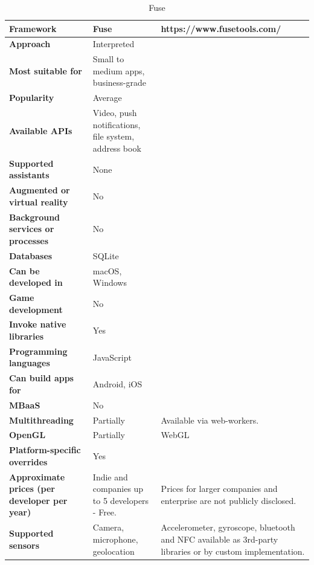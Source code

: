 \documentclass[english,master,public,dept460,male,cpdeclaration,oneside]{diploma}
\begin{document}
\begin{table}[!h]
	\centering
	\caption{Fuse}
	\begin{tabular}{p{} | p{} | p{}}
		\toprule		
		\textbf{Framework} & \textbf{Fuse} & https://www.fusetools.com/ \\
		\midrule
		\textbf{Approach} & Interpreted & \\			
		\midrule	
		\textbf{Most suitable for} & Small to medium apps, business-grade & \\
		\midrule
		\textbf{Popularity} & Average & \\			
		\midrule
		\textbf{Available APIs} & Video, push notifications, file system, address book & \\			
		\midrule
		\textbf{Supported assistants} & None & \\			
		\midrule
		\textbf{Augmented or virtual reality} & No & \\			
		\midrule
		\textbf{Background services or processes} & No & \\			
		\midrule
		\textbf{Databases} & SQLite & \\			
		\midrule
		\textbf{Can be developed in} & macOS, Windows &  \\			
		\midrule
		\textbf{Game development} & No & \\			
		\midrule
		\textbf{Invoke native libraries} & Yes & \\			
		\midrule
		\textbf{Programming languages} & JavaScript & \\			
		\midrule
		\textbf{Can build apps for} & Android, iOS & \\			
		\midrule
		\textbf{MBaaS} & No & \\			
		\midrule
		\textbf{Multithreading} & Partially & Available via web-workers. \\			
		\midrule
		\textbf{OpenGL} & Partially & WebGL \\			
		\midrule
		\textbf{Platform-specific overrides} & Yes & \\			
		\midrule
		\textbf{Approximate prices (per developer per year)} & Indie and companies up to 5 developers - Free. & Prices for larger companies and enterprise are not publicly disclosed. \\			
		\midrule
		\textbf{Supported sensors} & Camera, microphone, geolocation & Accelerometer, gyroscope, bluetooth and NFC available as 3rd-party libraries or by custom implementation.\\			
		\midrule
	\end{tabular}
\end{table}
\end{document}
